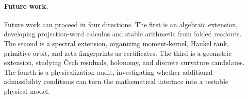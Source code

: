\paragraph{Future work.}
Future work can proceed in four directions.  The first is an algebraic extension, developing projection-word calculus and stable arithmetic from folded readouts.  The second is a spectral extension, organizing moment-kernel, Hankel rank, primitive orbit, and zeta fingerprints as certificates.  The third is a geometric extension, studying \v{C}ech residuals, holonomy, and discrete curvature candidates.  The fourth is a physicalization audit, investigating whether additional admissibility conditions can turn the mathematical interface into a testable physical model.

